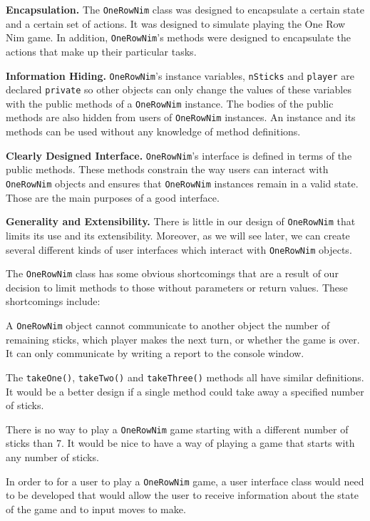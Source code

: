 \begin{BL}

\item  {\bf Encapsulation.}
The {\tt OneRowNim} class was designed to encapsulate a certain state
and a certain set of actions. It was designed to simulate playing the
One Row Nim game. In addition, {\tt OneRowNim}'s methods were designed
to encapsulate the actions that make up their particular tasks.

\item  {\bf Information Hiding.}
{\tt OneRowNim}'s instance variables, {\tt nSticks} and {\tt player}
are declared {\tt private} so other objects can only change the values
of these variables with the public methods of a {\tt OneRowNim}
instance.  The bodies of the public methods are also hidden from users
of {\tt OneRowNim} instances.  An instance and its methods can be used
without any knowledge of method definitions.

\item  {\bf Clearly Designed Interface.}
{\tt OneRowNim}'s interface is defined in terms of the public methods.
These methods constrain the way users can interact with {\tt
OneRowNim} objects and ensures that {\tt OneRowNim} instances remain
in a valid state.  Those are the main purposes of a good interface.

\item  {\bf Generality and Extensibility.} There is little in our
design of \mbox{\tt OneRowNim} that limits its use and its
extensibility. Moreover, as we will see later, we can create several
different kinds of user interfaces which interact with {\tt OneRowNim}
objects.
\end{BL}

The {\tt OneRowNim} class has some obvious shortcomings that are a
result of our decision to limit methods to those without parameters or
return values.  These shortcomings include:
\begin{BL}
\item   A {\tt OneRowNim} object cannot communicate to another object 
the number of remaining sticks, which player makes the next turn, or
whether the game is over.  It can only communicate by writing a report
to the console window.

\item  The {\tt takeOne()}, {\tt takeTwo()} and {\tt takeThree()} methods
all have similar definitions.  It would be a better design if a single
method could take away a specified number of sticks.

\item  There is no way to play a {\tt OneRowNim} game starting with 
a different number of sticks than 7.  It would be nice to have a way
of playing a game that starts with any number of sticks.

\item  In order to for a user to play a {\tt OneRowNim} game, a user interface
class would need to be developed that would allow the user to receive
information about the state of the game and to input moves to make.
\end{BL}

